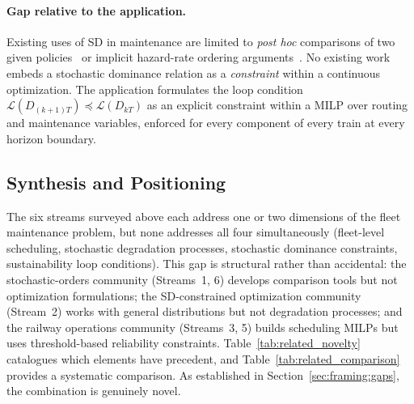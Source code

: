 \documentclass[11pt,a4paper]{article}
\theoremstyle{plain}
\theoremstyle{definition}
\theoremstyle{remark}
\begin{document}
\paragraph{Gap relative to the application.}
Existing uses of SD in maintenance are limited to \emph{post hoc} comparisons of two given policies~\cite{mercier2019} or implicit hazard-rate ordering arguments~\cite{barlow1996}. No existing work embeds a stochastic dominance relation as a \emph{constraint} within a continuous optimization. The application formulates the loop condition $\mathcal{L}(D_{(k+1)T})\preceq\mathcal{L}(D_{kT})$ as an explicit constraint within a MILP over routing and maintenance variables, enforced for every component of every train at every horizon boundary.

\subsection{Synthesis and Positioning}
\label{sec:related:synthesis}

The six streams surveyed above each address one or two dimensions of the fleet maintenance problem, but none addresses all four simultaneously (fleet-level scheduling, stochastic degradation processes, stochastic dominance constraints, sustainability loop conditions). This gap is structural rather than accidental: the stochastic-orders community (Streams~1, 6) develops comparison tools but not optimization formulations; the SD-constrained optimization community (Stream~2) works with general distributions but not degradation processes; and the railway operations community (Streams~3, 5) builds scheduling MILPs but uses threshold-based reliability constraints. Table~\ref{tab:related_novelty} catalogues which elements have precedent, and Table~\ref{tab:related_comparison} provides a systematic comparison. As established in Section~\ref{sec:framing:gaps}, the combination is genuinely novel.
\end{document}
